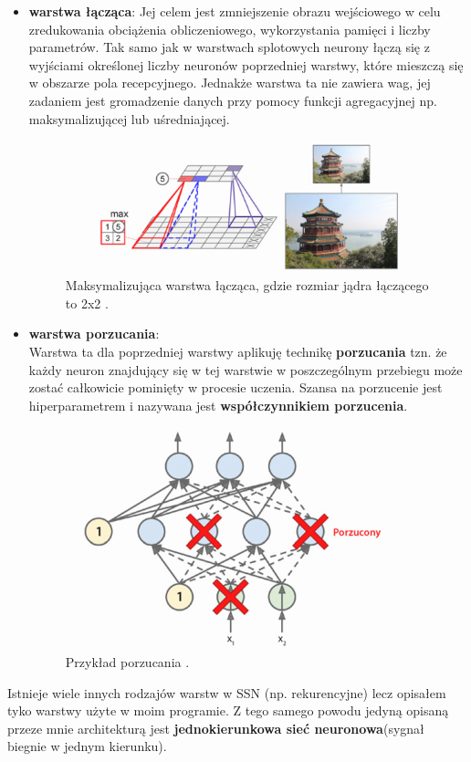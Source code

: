 \documentclass{article}
\begin{document}
\begin{itemize}
\item \textbf{warstwa łącząca}:
Jej celem jest zmniejszenie obrazu wejściowego w celu zredukowania obciążenia obliczeniowego,
wykorzystania pamięci i liczby parametrów. Tak samo jak w warstwach splotowych neurony 
łączą się z wyjściami określonej liczby neuronów poprzedniej warstwy, które mieszczą się w
obszarze pola recepcyjnego. Jednakże warstwa ta nie zawiera wag, jej zadaniem jest gromadzenie
danych przy pomocy funkcji agregacyjnej np. maksymalizującej lub uśredniającej.

\begin{figure}[H]
\centering
\includegraphics[scale=0.6]{pool.png}
\caption{Maksymalizująca warstwa łącząca, gdzie rozmiar jądra łączącego to 2x2 \cite{um}.}
\end{figure}

\item \textbf{warstwa porzucania}:\\
Warstwa ta dla poprzedniej warstwy aplikuję technikę \textbf{porzucania} tzn. że
każdy neuron znajdujący się w tej warstwie w poszczególnym przebiegu może zostać całkowicie
pominięty w procesie uczenia. Szansa na porzucenie jest hiperparametrem i nazywana jest 
\textbf{współczynnikiem porzucenia}.

\begin{figure}[H]
\centering
\includegraphics[scale=0.6]{dropout.png}
\caption{Przykład porzucania \cite{um}.}
\end{figure}

\end{itemize}
Istnieje wiele innych rodzajów warstw w SSN (np. rekurencyjne) lecz opisałem tyko warstwy
użyte w moim programie. Z tego samego powodu jedyną opisaną przeze mnie architekturą jest
\textbf{jednokierunkowa sieć neuronowa}(sygnał biegnie w jednym kierunku).
\end{document}
